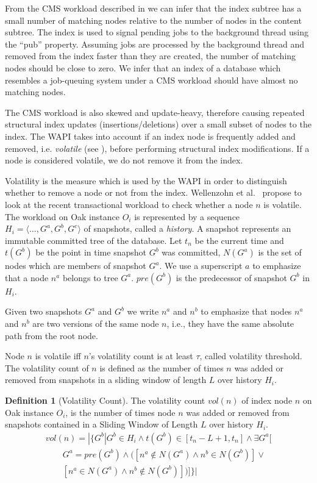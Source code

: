 \documentclass[abstracton,12pt]{scrartcl}
\theoremstyle{definition}
\newtheorem{definition}{Definition}
\begin{document}
From the CMS workload described in  we can infer that the index subtree has a small number of
matching nodes relative to the number of nodes in the content subtree. The index is
 used to signal pending jobs to the background thread using
the ``pub'' property. Assuming jobs are processed by
the background thread and removed from the index faster than they are created,
the number of matching nodes should be close to zero. We infer that an index of
a database which resembles a job-queuing system under a CMS workload should have
almost no matching nodes. 

The CMS workload is also skewed and update-heavy, therefore causing repeated structural index
updates (insertions/deletions) over a small subset of nodes to the index.
The WAPI takes into account if an index node is frequently added and removed,
i.e. \textit{volatile} (see ), before performing structural
index modifications. If a node is considered volatile, we do not remove it from the index.

Volatility is the measure which is used by the WAPI in order to distinguish
whether to remove a node or not from the index.
Wellenzohn et al.~\cite{KW17} propose to look at the recent transactional
workload to check whether a node $n$ is volatile. The workload on Oak instance
$O_i$ is represented by a sequence $H_i = \langle \ldots, G^a, G^b, G^c
\rangle$ of snapshots, called a \textit{history}. A snapshot represents an immutable
committed tree of the database. Let $t_n$ be the current time and
$t(G^b)$ be the point in time snapshot $G^b$ was committed, $N(G^a)$ is the
set of nodes which are members of snapshot $G^a$. We use a superscript $a$
to emphasize that a node $n^a$ belongs to tree $G^a$. $pre(G^b)$ is the
predecessor of snapshot $G^b$ in $H_i$.

Given two snapshots $G^a$ and $G^b$ we write $n^a$ and $n^b$ to emphasize that
nodes $n^a$ and $n^b$ are two versions of the same node $n$, i.e., they have
the same absolute path from the root node.

Node $n$ is volatile iff $n$'s volatility count is at least $\tau$, called
volatility threshold. The volatility count of $n$ is defined as the number of
times $n$ was added or removed from snapshots in a sliding window of length
$L$ over history $H_i$.

\begin{definition}[Volatility Count]
  The volatility count $vol(n)$ of index node $n$ on Oak instance $O_i$, is the number of
  times node $n$ was added or removed from snapshots contained in a Sliding
  Window of Length $L$ over history $H_i$.
  \begin{align*}
    vol(n) = | \{ G^b | G^b \in H_i \land t(G^b) \in [t_n-L+1, t_n] \land \exists G^a[ \\
    \qquad G^a = pre(G^b) \land ([n^a \notin N(G^a) \land n^b \in N(G^b)]\lor \\
    \qquad [n^a \in N(G^a) \land n^b \notin N(G^b)] )]\} |
  \end{align*}
  \label{def:vol_count}
\end{definition}
\end{document}
